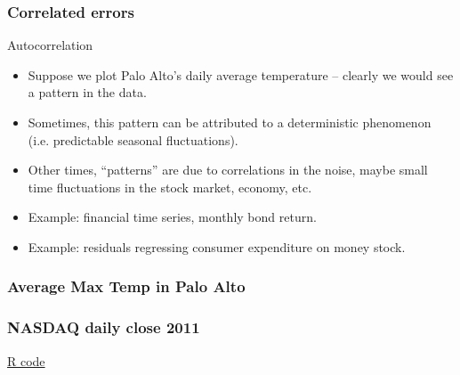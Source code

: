\documentclass[handout]{beamer}
\begin{document}

   \begin{frame} \frametitle{Correlated errors}

   \begin{block}
   {Autocorrelation                     }
   \begin{itemize}

   \item Suppose we plot Palo Alto's daily average temperature --
   clearly we would see a pattern in the data.
   \item Sometimes, this pattern can be attributed to a deterministic
   phenomenon (i.e. predictable seasonal fluctuations).

   \item Other times, ``patterns'' are due to correlations in the noise, maybe small time fluctuations in the stock market, economy, etc.



   \item Example: financial time series, monthly bond return.

   \item Example: residuals regressing consumer expenditure on money stock.
   \end{itemize}
   \end{block}
   \end{frame}



   \begin{frame}
   \frametitle{Average Max Temp in Palo Alto}
   \begin{center}
   \end{center}

   \end{frame}



   \begin{frame}
   \frametitle{NASDAQ daily close 2011}
   \begin{center}
   \end{center}
   \href{http://stats191.stanford.edu/correlated_errors.html#nasdag}{R code}
   \end{frame}
\end{document}
